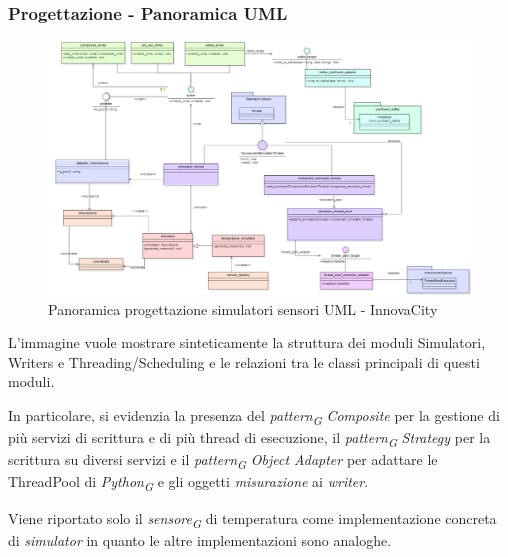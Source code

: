 \subsubsection{Progettazione - Panoramica UML }
\begin{figure}[H]
    \centering
    \includegraphics[width=1.1\textwidth]{../Images/SpecificaTecnica/progettazioneCompSimulatori.PNG}
    \caption{Panoramica progettazione simulatori sensori UML - InnovaCity}
    \label{fig: panor_sim}
\end{figure}
L'immagine vuole mostrare sinteticamente la struttura dei moduli Simulatori, Writers e Threading/Scheduling e le relazioni tra le classi principali di questi moduli.

In particolare, si evidenzia la presenza del \textit{pattern}\textsubscript{\textit{G}} \textit{Composite} per la gestione di più servizi di scrittura e di più thread di esecuzione, il \textit{pattern}\textsubscript{\textit{G}} \textit{Strategy} per la scrittura su diversi servizi e il \textit{pattern}\textsubscript{\textit{G}} \textit{Object Adapter} per adattare le ThreadPool di \textit{Python}\textsubscript{\textit{G}} e gli oggetti \textit{misurazione} ai \textit{writer}.

Viene riportato solo il \textit{sensore}\textsubscript{\textit{G}} di temperatura come implementazione concreta di \textit{simulator} in quanto le altre implementazioni sono analoghe.